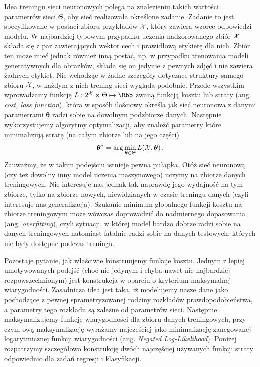 \documentclass{myclass}
\begin{document}
Idea treningu sieci neuronowych polega na znalezieniu takich wartości parametrów sieci \(\Theta\),
aby sieć realizowała określone zadanie. Zadanie to jest specyfikowane w postaci zbioru przykładów
\(\mathcal{X}\), który zawiera wzorce odpowiedzi modelu. W najbardziej typowym przypadku uczenia
nadzorowanego zbiór \(\mathcal{X}\) składa się z par zawierających wektor cech i prawidłową etykietę dla
nich. Zbiór ten może mieć jednak również inną postać, np. w przypadku trenowania modeli
generatywnych dla obrazków, składa się on jedynie z pewnych zdjęć i nie zawiera żadnych etykiet. Nie
wchodząc w żadne szczegóły dotyczące struktury samego zbioru \(\mathcal{X}\), w każdym z nich trening
sieci wygląda podobnie. Przede wszystkim wprowadzamy funkcję \(L: 2^\mc{X} \times \Theta \mapsto
\Rbb\) zwaną funkcją kosztu lub straty (ang. \emph{cost, loss function}), która w sposób ilościowy
określa jak sieć neuronowa z danymi parametrami \(\bm{\theta}\) radzi sobie na dowolnym podzbiorze
danych. Następnie wykorzystujemy algorytmy optymalizacji, aby znaleźć parametry które minimalizują
stratę (na całym zbiorze lub na jego części)
\[
    \bm{\theta}^* = \arg\min_{\bm{\theta} \in \Theta} L(\mathcal{X}, \bm{\theta})\,.
\]
Zauważmy, że w takim podejściu istnieje pewna pułapka. Otóż sieć neuronową (czy też dowolny inny
model uczenia maszynowego) uczymy na zbiorze danych treningowych. Nie interesuje nas jednak tak
naprawdę jego wydajność na tym zbiorze, tylko na zbiorze nowych, niewidzianych w czasie treningu
danych (czyli interesuje nas generalizacja). Szukanie minimum globalnego funkcji kosztu na zbiorze
treningowym może wówczas doprowadzić do nadmiernego dopasowania (ang. \emph{overfitting}), czyli
sytuacji, w której model bardzo dobrze radzi sobie na danych treningowych natomiast fatalnie radzi
sobie na danych testowych, których nie były dostępne podczas treningu.

\medskip

Pozostaje pytanie, jak właściwie konstruujemy funkcje kosztu. Jednym z lepiej umotywowanych podejść
(choć nie jedynym i chyba nawet nie najbardziej rozpowszechnionym) jest konstrukcja w oparciu o
kryterium maksymalnej wiarygodności. Zasadnicza idea jest taka, iż modelujemy nasze dane jako
pochodzące z pewnej sprametryzowanej rodziny rozkładów prawdopodobieństwa, a parametry tego rozkładu
są zależne od parametrów sieci. Następnie maksymalizujemy funkcję wiarygodności dla zbioru danych
treningowych, przy czym ową maksymalizację wyrażamy najczęściej jako minimalizację zanegowanej
logarytmicznej funkcji wiarygodności (ang. \emph{Negated Log-Likelihood}). Poniżej rozpatrzymy
szczegółowo konstrukcję dwóch najczęściej używanych funkcji straty odpowiednio dla zadań regresji i
klasyfikacji.
\end{document}

